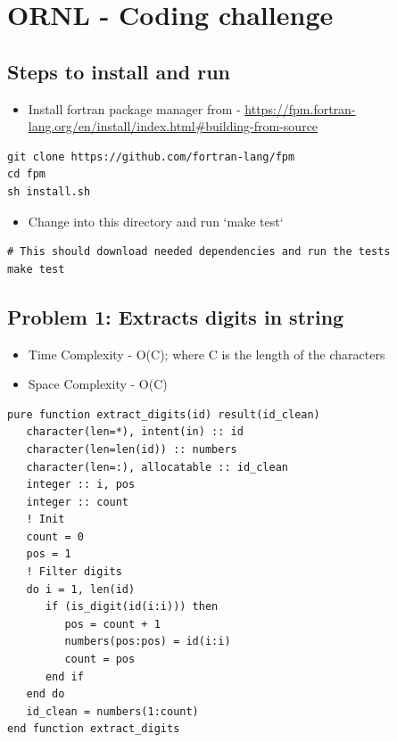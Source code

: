 \documentclass[11pt]{article}
\author{arul}
\date{\today}
\title{}
\begin{document}
\tableofcontents

\section{ORNL - Coding challenge}
\label{sec:orgecb3635}
\subsection{Steps to install and run}
\label{sec:org880aa44}
\begin{itemize}
\item Install fortran package manager from - \url{https://fpm.fortran-lang.org/en/install/index.html\#building-from-source}
\end{itemize}
\begin{verbatim}
git clone https://github.com/fortran-lang/fpm
cd fpm
sh install.sh
\end{verbatim}
\begin{itemize}
\item Change into this directory and run `make test`
\end{itemize}
\begin{verbatim}
# This should download needed dependencies and run the tests
make test
\end{verbatim}
\subsection{Problem 1: Extracts digits in string}
\label{sec:org9177814}
\begin{itemize}
\item Time Complexity - O(C); where C is the length of the characters
\item Space Complexity - O(C)
\end{itemize}
\begin{verbatim}
pure function extract_digits(id) result(id_clean)
   character(len=*), intent(in) :: id
   character(len=len(id)) :: numbers
   character(len=:), allocatable :: id_clean
   integer :: i, pos
   integer :: count
   ! Init
   count = 0
   pos = 1
   ! Filter digits
   do i = 1, len(id)
      if (is_digit(id(i:i))) then
         pos = count + 1
         numbers(pos:pos) = id(i:i)
         count = pos
      end if
   end do
   id_clean = numbers(1:count)
end function extract_digits
\end{verbatim}
\end{document}
